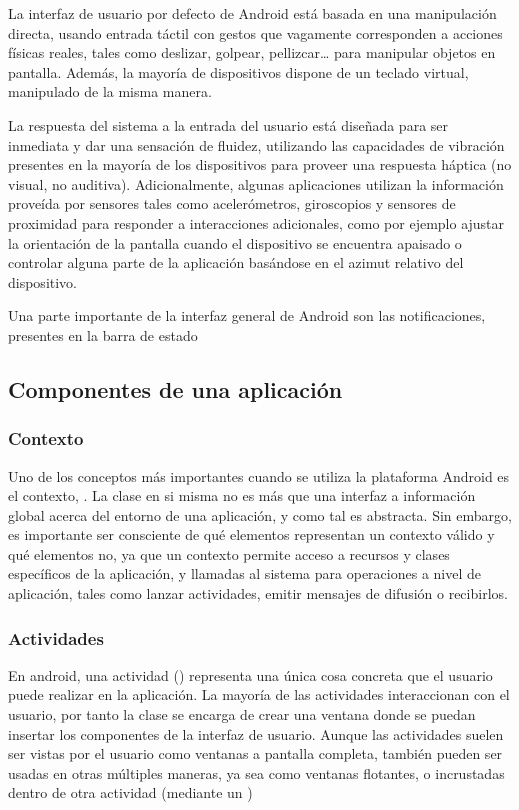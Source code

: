 La interfaz de usuario por defecto de Android está basada en una manipulación directa, usando entrada táctil con gestos que vagamente corresponden a acciones físicas reales, tales como deslizar, golpear, pellizcar… para manipular objetos en pantalla. Además, la mayoría de dispositivos dispone de un teclado virtual, manipulado de la misma manera. 

La respuesta del sistema a la entrada del usuario está diseñada para ser inmediata y dar una sensación de fluidez, utilizando las capacidades de vibración presentes en la mayoría de los dispositivos para proveer una respuesta háptica (no visual, no auditiva). Adicionalmente, algunas aplicaciones utilizan la información proveída por sensores tales como acelerómetros, giroscopios y sensores de proximidad para responder a interacciones adicionales, como por ejemplo ajustar la orientación de la pantalla cuando el dispositivo se encuentra apaisado o controlar alguna parte de la aplicación basándose en el azimut relativo del dispositivo.

Una parte importante de la interfaz general de Android son las notificaciones, presentes en la barra de estado

\subsection{Componentes de una aplicación}

\subsubsection{Contexto}

Uno de los conceptos más importantes cuando se utiliza la plataforma Android es el contexto, . La clase  en si misma no es más que una interfaz a información global acerca del entorno de una aplicación, y como tal es abstracta. Sin embargo, es importante ser consciente de qué elementos representan un contexto válido y qué elementos no, ya que un contexto permite acceso a recursos y clases específicos de la aplicación, y llamadas al sistema para operaciones a nivel de aplicación, tales como lanzar actividades, emitir mensajes de difusión o recibirlos.

\subsubsection{Actividades}

En android, una actividad () representa una única cosa concreta que el usuario puede realizar en la aplicación. La mayoría de las actividades interaccionan con el usuario, por tanto la clase  se encarga de crear una ventana donde se puedan insertar los componentes de la interfaz de usuario. Aunque las actividades suelen ser vistas por el usuario como ventanas a pantalla completa, también pueden ser usadas en otras múltiples maneras, ya sea como ventanas flotantes, o incrustadas dentro de otra actividad (mediante un )

